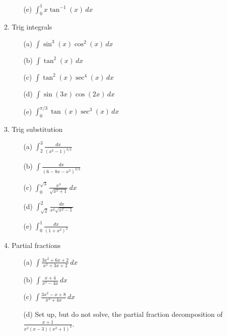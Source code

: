 \documentclass[12pt]{article}
\begin{document}
\begin{enumerate}
\begin{enumerate}
\item[(e)] $\int_0^1x\tan^{-1}(x)\,dx$

\end{enumerate}

\setcounter{enumi}{9}
\item Trig integrals
\begin{enumerate}
\item[(a)] $\int\sin^3(x)\cos^2(x)\,dx$

\item[(b)] $\int\tan^2(x)\,dx$

\item[(c)] $\int\tan^2(x)\sec^4(x)\,dx$

\item[(d)] $\int\sin(3x)\cos(2x)\,dx$

\item[(e)] $\int_0^{\pi/3}\tan(x)\sec^3(x)\,dx$

\end{enumerate}

\setcounter{enumi}{10}
\item Trig substitution
\begin{enumerate}
\item[(a)] $\int_2^3\frac{dx}{(x^2-1)^{3/2}}$

\item[(b)] $\int\frac{dx}{(6-8x-x^2)^{3/2}}$

\item[(c)] $\int_0^{\sqrt3}\frac{x^3}{\sqrt{x^2+1}}\,dx$

\item[(d)] $\int_{\sqrt2}^2\frac{dx}{x^2\sqrt{x^2-1}}$

\item[(e)] $\int_0^1\frac{dx}{(1+x^2)^2}$

\end{enumerate}

\setcounter{enumi}{11}
\item Partial fractions
\begin{enumerate}
\item[(a)] $\int\frac{3x^2+6x+2}{x^2+3x+2}\,dx$

\item[(b)] $\int\frac{x+4}{x^3-4x}\,dx$

\item[(c)] $\int\frac{3x^2-x+8}{x^3+4x}\,dx$

\item[(d)] Set up, but do not solve, the partial fraction decomposition of $\frac{x+1}{x^2(x-3)(x^2+1)^2}$.


\end{enumerate}
\end{enumerate}
\end{document}
